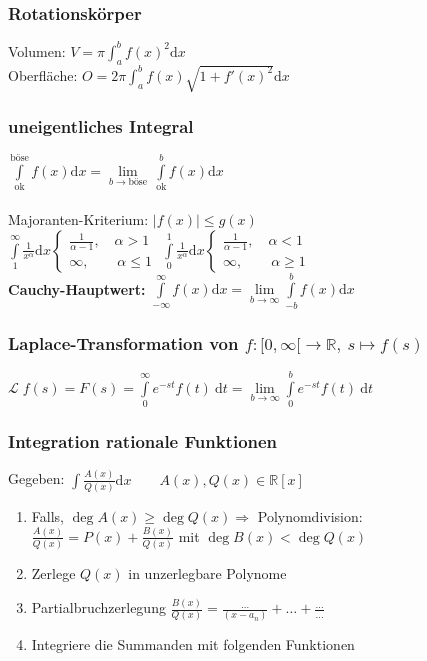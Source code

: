 \documentclass[6pt,a4paper]{scrartcl}
\newcommand{\Ra}[0]{\ensuremath{\Rightarrow}}
\newcommand{\ra}[0]{\ensuremath{\rightarrow}}
\begin{document}
\begin{multicols}{4}
\subsubsection{Rotationskörper}
Volumen: $V = \pi \int_a^b f(x)^2 \mathrm dx$\\
Oberfläche: $O = 2 \pi \int_a^b f(x) \sqrt{1 + f'(x)^2} \mathrm dx$

\subsubsection{uneigentliches Integral}
$\int\limits_{\text{ok}}^{\text{böse}} f(x) \mathrm dx = \lim\limits_{b\rightarrow \text{böse}}\ \int\limits_{\text{ok}}^b f(x) \mathrm dx$\\
\\
Majoranten-Kriterium: $|f(x)|\le g(x)$\\
$\int\limits_{1}^{\infty} \frac{1}{x^\alpha} \mathrm dx \begin{cases} \frac{1}{\alpha -1}, \quad \alpha > 1 \\ \infty, \qquad \alpha \le 1 \end{cases}$ \qquad
$\int\limits_{0}^{1} \frac{1}{x^\alpha} \mathrm dx \begin{cases} \frac{1}{\alpha -1}, \quad \alpha < 1 \\ \infty, \qquad \alpha \ge 1 \end{cases}$\\
\textbf{Cauchy-Hauptwert:} $\int\limits_{-\infty}^{\infty} f(x) \mathrm dx = \lim\limits_{b\rightarrow\infty} \int\limits_{-b}^b f(x) \mathrm dx$

\subsubsection{Laplace-Transformation von $f: [0,\infty[ \ra \mathbb R,\ s \mapsto f(s)$}
$\mathcal L \; f(s) = F(s) = \int\limits_{0}^{\infty} e^{-st} f(t)\ \mathrm dt = \lim\limits_{b \ra \infty} \int\limits_{0}^{b} e^{-st} f(t)\ \mathrm dt$

\subsubsection{Integration rationale Funktionen}
Gegeben: $\int \frac{A(x)}{Q(x)} \mathrm dx \qquad A(x),Q(x)\in \mathbb R[x]$
\begin{enumerate}\itemsep0pt
\item Falls, $\deg A(x) \ge \deg Q(x) \Ra$ Polynomdivision: \\ $\frac{A(x)}{Q(x)} = P(x) + \frac{B(x)}{Q(x)}$ mit $\deg B(x) < \deg Q(x)$
\item Zerlege $Q(x)$ in unzerlegbare Polynome
\item Partialbruchzerlegung $\frac{B(x)}{Q(x)} = \frac{\ldots}{(x - a_n)} + \ldots + \frac{\ldots}{\ldots}$
\item Integriere die Summanden mit folgenden Funktionen
\end{enumerate}


\end{multicols}
\end{document}
